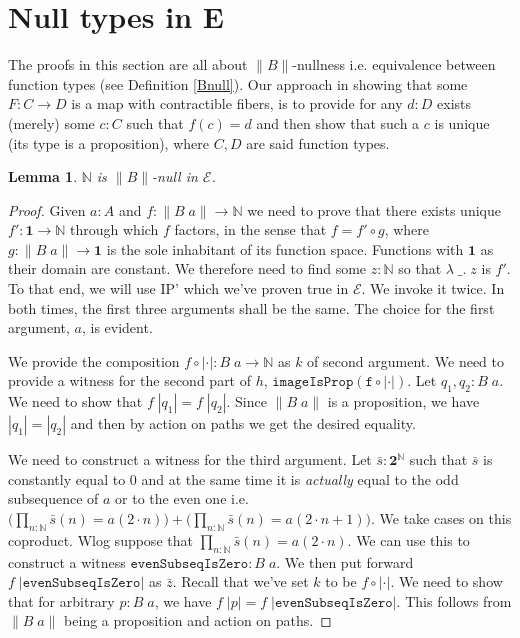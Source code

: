 \documentclass[12pt]{report}
\newtheorem{lem}[thm]{Lemma}
\begin{document}
\section{Null types in E}
The proofs in this section are all about $\lVert B \rVert$-nullness i.e. equivalence between function types (see Definition \ref{Bnull}). 
Our approach in showing that some $F: C\rightarrow D$ is a map with contractible fibers, is to provide for any $d :D$ exists (merely) some $c :C$ such that $f(c) = d$ and then show that such a $c$ is unique (its type is a proposition), where $C,D$ are said function types. 
\begin{lem}\label{NisBnull}
$\mathbb{N}$ is $\lVert B \rVert$-null in $\mathcal{E}$.
\end{lem}
\begin{proof}
Given $a : A$ and $f : \lVert B\; a \rVert \rightarrow \mathbb{N}$ we need to prove that there exists unique $f' : \mathbf{1} \rightarrow \mathbb{N}$ through which $f$ factors, in the sense that $f = f' \circ g$, where $g : \lVert B\; a \rVert \rightarrow \mathbf{1}$ is the sole inhabitant of its function space. 
Functions with $\mathbf{1}$ as their domain are constant. 
We therefore need to find some $z : \mathbb{N}$ so that $\lambda\; \_.\; z$ is $f'$. 
To that end, we will use IP' which we've proven true in $\mathcal{E}$. 
We invoke it twice. 
In both times, the first three arguments shall be the same. 
The choice for the first argument, $a$, is evident. 

We provide the composition $f \circ |\cdot| : B\; a \rightarrow \mathbb{N}$ as $k$ of second argument. 
We need to provide a witness for the second part of $h$, $\mathtt{imageIsProp(f \circ |\cdot|)}$. 
Let $q_1,q_2 : B\;a$. 
We need to show that $f\;|q_1| = f\; |q_2|$. 
Since $\lVert B\; a\rVert$ is a proposition, we have $|q_1| = |q_2|$ and then by action on paths we get the desired equality.

We need to construct a witness for the third argument. 
Let $\bar{s} : \mathbf{2}^\mathbb{N}$ such that $\bar{s}$ is constantly equal to $0$ and at the same time it is \textit{actually} equal to the odd subsequence of $a$ or to the even one i.e. $\big(\prod_{n : \mathbb{N}} \bar{s}(n) = a(2 \cdot n)\big) + \big(\prod_{n : \mathbb{N}} \bar{s}(n) = a(2\cdot n +1)\big)$. 
We take cases on this coproduct. 
Wlog suppose that $\prod_{n : \mathbb{N}} \bar{s}(n) = a(2 \cdot n)$. 
We can use this to construct a witness $\mathtt{evenSubseqIsZero} : B\;a$. 
We then put forward $f\;|\mathtt{evenSubseqIsZero}|$ as $\bar{z}$. 
Recall that we've set $k$ to be $f\circ |\cdot|$.
We need to show that for arbitrary $p : B\;a $, we have $f\; |p| = f\;|\mathtt{evenSubseqIsZero}|$. 
This follows from $\lVert B\;a\rVert$ being a proposition and action on paths. 


\end{proof}
\end{document}
